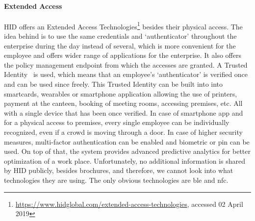 \paragraph{Extended Access}
HID offers an Extended Access Technologies\footnote{\url{ https://www.hidglobal.com/extended-access-technologies}, accessed 02 April 2019} besides their physical access. The idea behind is to use the same credentials and ‘authenticator’ throughout the enterprise during the day instead of several, which is more convenient for the employee and offers wider range of applications for the enterprise. It also offers the policy management endpoint from which the accesses are granted. A Trusted Identity~\cite{2018ExperiencingPredictive} is used, which means that an employee’s ‘authenticator’ is verified once and can be used since freely. This Trusted Identity can be built into into smartcards, wearables or smartphone application allowing the use of printers, payment at the canteen, booking of meeting rooms, accessing premises, etc. All with a single device that has been once verified. In case of smartphone app and for a physical access to premises, every single employee can be individually recognized, even if a crowd is moving through a door. In case of higher security measures, multi-factor authentication can be enabled and biometric or \acrshort{pin} can be used. On top of that, the system provides advanced predictive analytics for better optimization of a work place. Unfortunately, no additional information is shared by HID publicly, besides brochures, and therefore, we cannot look into what technologies they are using. The only obvious technologies are \acrshort{ble} and \acrshort{nfc}.